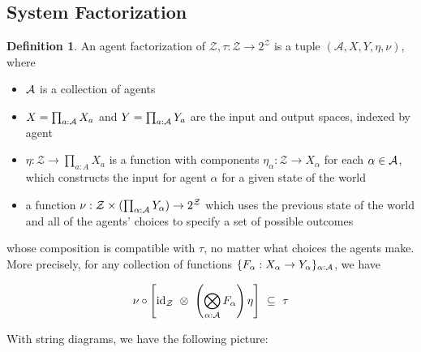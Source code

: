 \documentclass{article}
\theoremstyle{definition}
\newtheorem{defn}{Definition}
\newcommand{\Z}{\mathcal Z}
\begin{document}
	\subsection{System Factorization}
	\begin{defn}
		An agent factorization of $\Z, \tau : \Z \to 2^\Z$ is a tuple $(\mathcal A, X, Y, \eta, \nu)$, where
		
		\begin{itemize}\setlength\itemsep{-0.4em}
			\item $\cal A$ is a collection of agents
			\item $X = \prod_{a : \cal A} X_a$ and $Y = \prod_{a : \cal A} Y_a$ are the input and output spaces, indexed by agent
			\item $\eta: \Z \to \prod_{a: A} X_a$ is a function with components $\eta_\alpha: \Z \to X_\alpha$ for each $\alpha \in \cal A$, which constructs the input for agent $\alpha$ for a given state of the world
			\item a function $\nu: \Z \times (\prod_{\alpha: \cal A} Y_\alpha) \to 2^\Z$ which uses the previous state of the world and all of the agents' choices to specify a set of possible outcomes
		\end{itemize}
		whose composition is compatible with $\tau$, no matter what choices the agents make. More precisely, for any collection of functions $\{F_\alpha: X_\alpha \to Y_\alpha\}_{\alpha : \cal A}$, we have
		
		\begin{equation} \label{eq:same}
		\nu \circ \left[ \mathrm{id}_\Z  ~\otimes~ \left(\bigotimes_{\alpha : \cal A} F_\alpha \right) \eta \right] ~\subseteq~\tau
		\end{equation} 
	\end{defn}
	
	
	With string diagrams, we have the following picture:
	\vspace{1em}
	\begin{center}
	\end{center}
\end{document}
